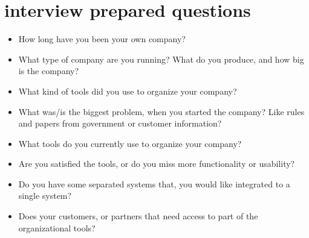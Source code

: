 \section{interview prepared questions}

\begin{itemize}
  \item How long have you been your own company?
  \item What type of company are you running? What do you produce, and how big is the company? 
  \item What kind of tools did you use to organize your company?
  \item What was/is the biggest problem, when you started the company? Like rules and papers from government or customer information?
  \item What tools do you currently use to organize your company?
  \item Are you satisfied the tools, or do you miss more functionality or usability?
  \item Do you have some separated systems that, you would like integrated to a single system?
  \item Does your customers, or partners that need access to part of the organizational tools?  
\end{itemize}